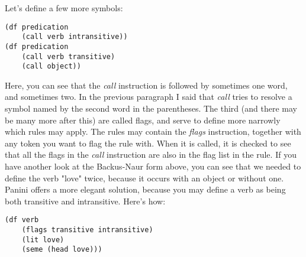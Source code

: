 \documentclass{article}
\begin{document}
Let's define a few more symbols:
\begin{lstlisting}
(df predication
	(call verb intransitive))
(df predication
	(call verb transitive)
	(call object))
\end{lstlisting}
Here, you can see that the \emph{call} instruction is followed by sometimes one word, and sometimes two. In the previous paragraph I
said that \emph{call} tries to resolve a symbol named by the second word in the parentheses. The third (and there may be many more
after this) are called flags, and serve to define more narrowly which rules may apply. The rules may contain the \emph{flags} 
instruction, together with any token you want to flag the rule with. When it is called, it is checked to see that all the flags in 
the \emph{call} instruction are also in the flag list in the rule. If you have another look at the Backus-Naur form above, you can 
see that we needed to define the verb "love" twice, because it occurs with an object or without one. 
Panini offers a more elegant solution, because you may define a verb as being both transitive and intransitive. Here's how:
\begin{lstlisting}
(df verb
	(flags transitive intransitive)
	(lit love)
	(seme (head love)))
\end{lstlisting}


\label{end}
\end{document}

